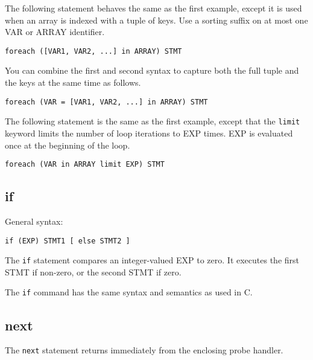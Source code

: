 \documentclass[twoside,english]{article}
\newenvironment{vindent}
{\begin{list}{}{\setlength{\listparindent}{6pt}}
\item[]}
{\end{list}}
\begin{document}
The following statement behaves the same as the first example, except it
is used when an array is indexed with a tuple of keys.  Use a sorting suffix
on at most one VAR or ARRAY identifier.

\begin{vindent}
\begin{verbatim}
foreach ([VAR1, VAR2, ...] in ARRAY) STMT
\end{verbatim}
\end{vindent}

You can combine the first and second syntax to capture both the full tuple
and the keys at the same time as follows.
\begin{vindent}
\begin{verbatim}
foreach (VAR = [VAR1, VAR2, ...] in ARRAY) STMT
\end{verbatim}
\end{vindent}

The following statement is the same as the first example, except that the
\texttt{limit} keyword limits the number of loop iterations to EXP times.
EXP is evaluated once at the beginning of the loop.

\begin{vindent}
\begin{verbatim}
foreach (VAR in ARRAY limit EXP) STMT
\end{verbatim}
\end{vindent}

\subsection{if}
General syntax:

\begin{vindent}
\begin{verbatim}
if (EXP) STMT1 [ else STMT2 ]
\end{verbatim}
\end{vindent}
The \texttt{if} statement compares an integer-valued EXP to zero. It executes
the first STMT if non-zero, or the second STMT if zero.

The \texttt{if} command has the same syntax and semantics as used in C.


\subsection{next}
The \texttt{next} statement returns immediately from the enclosing probe
handler.
\end{document}
